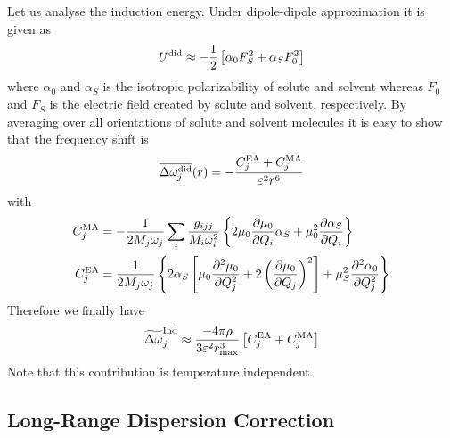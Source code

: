 \documentclass[a4paper,titlepage,twoside,fleqn,12pt]{book}
\newcommand{\fderiv}[2]{\ensuremath{
    \frac{\partial #1}{\partial #2}}}
\newcommand{\sderiv}[2]{\ensuremath{
    \frac{\partial^2 #1}{\partial #2^2}
    }}
\begin{document}
\begin{refsection}
Let us analyse the induction energy. Under dipole\hyp{}dipole
approximation it is given as
%
\begin{equation}
 U^{\rm did} \approx -\frac{1}{2} \left[ \alpha_0 F_S^2 + \alpha_S F_0^2\right]
\end{equation}
%
where $\alpha_0$ and $\alpha_S$ is the isotropic polarizability
of solute and solvent whereas $F_0$ and $F_S$ is the electric field
created by solute and solvent, respectively.
By averaging over all orientations of solute and solvent
molecules it is easy to show that
the frequency shift is
%
\begin{equation}
 \overline{\Delta \omega_j^{\rm did}}(r) = 
-\frac{C_j^{\rm EA} + C_j^{\rm MA} }{\varepsilon^2 r^6}
\end{equation}
%
with
%
\begin{subequations}
\begin{align}
  C_j^{\rm MA} &= -\frac{1}{2M_j\omega_j}\sum_i \frac{g_{ijj}}{M_i\omega_i^2} \left\{ 
   2\mu_0\fderiv{\mu_0}{Q_i}\alpha_S + \mu_0^2\fderiv{\alpha_S}{Q_i}
\right\} \\
  C_j^{\rm EA} &= \frac{1}{2M_j\omega_j} \left\{ 
  2\alpha_S\left[
      \mu_0\sderiv{\mu_0}{Q_j} + 2\left(\fderiv{\mu_0}{Q_j}\right)^2 
    \right]
   + \mu_S^2 \sderiv{\alpha_0}{Q_j}
\right\}
\end{align}
\end{subequations}
%
Therefore we finally have
%
\begin{equation} \label{e:x12341}
 \widetilde{\Delta \omega}_j^{\rm Ind} \approx
\frac{-4\pi\rho}{3\varepsilon^2 r_{\max}^3} \left[ C_j^{\rm EA} + C_j^{\rm MA} \right]
\end{equation}
%
Note that this contribution is temperature independent.

\subsection{Long\hyp{}Range Dispersion Correction}


\end{refsection}
\end{document}

